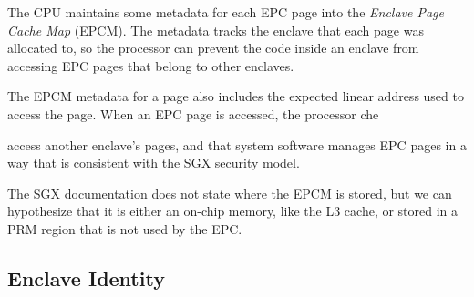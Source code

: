 The CPU maintains some metadata for each EPC page into the \textit{Enclave Page
Cache Map} (EPCM). The metadata tracks the enclave that each page was allocated
to, so the processor can prevent the code inside an enclave from accessing EPC
pages that belong to other enclaves.

The EPCM metadata for a page also includes the expected linear address used to
access the page. When an EPC page is accessed, the processor che

access another enclave's pages, and that system software manages EPC pages in a
way that is consistent with the SGX security model.


The SGX documentation does
not state where the EPCM is stored, but we can hypothesize that it is either
an on-chip memory, like the L3 cache, or stored in a PRM region that is not
used by the EPC.



\begin{table}[hbt]
  \caption{
    The fields in an EPCM entry.
  }
  \label{fig:epcm_entry}
\end{table}




\subsection{Enclave Identity}


